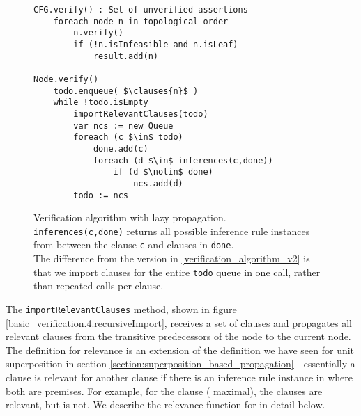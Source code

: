 \begin{figure}
\begin{lstlisting}
CFG.verify() : Set of unverified assertions
	foreach node n in topological order
		n.verify()
		if (!n.isInfeasible and n.isLeaf)
			result.add(n)

Node.verify()
	todo.enqueue( $\clauses{n}$ )
	while !todo.isEmpty
		importRelevantClauses(todo)
		var ncs := new Queue
		foreach (c $\in$ todo)
			done.add(c)
			foreach (d $\in$ inferences(c,done))
				if (d $\notin$ done)
					ncs.add(d)
		todo := ncs
\end{lstlisting}
\caption{Verification algorithm with lazy propagation.\\
\lstinline|inferences(c,done)| returns all possible inference rule instances from \SPG{} between the clause \lstinline|c| and clauses in \lstinline|done|.\\
The difference from the version in \ref{verification_algorithm_v2} is that we import clauses for the entire \lstinline|todo| queue in one call, rather than repeated calls per clause.
}
\label{verification_algorithm_v_3}
\end{figure}


%
%

The \lstinline|importRelevantClauses| method, shown in figure \ref{basic_verification.4.recursiveImport}, receives a set of clauses and propagates all relevant clauses from the transitive predecessors of the node to the current node. The definition for relevance is an extension of the definition we have seen for unit superposition in section \ref{section:superposition_based_propagation} - essentially a clause is relevant for another clause if there is an inference rule instance in \SPG{} where both are premises. 
For example, for the clause  ( maximal), the clauses  are relevant, but  is not.
We describe the relevance function for \SPG{} in detail below.

